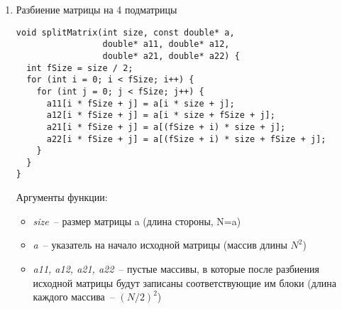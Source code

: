 \documentclass{report}
\begin{document}
\begin{enumerate}
\item Разбиение матрицы на 4 подматрицы
\begin{lstlisting}
void splitMatrix(int size, const double* a,
                 double* a11, double* a12,
                 double* a21, double* a22) {
  int fSize = size / 2;
  for (int i = 0; i < fSize; i++) {
    for (int j = 0; j < fSize; j++) {
      a11[i * fSize + j] = a[i * size + j];
      a12[i * fSize + j] = a[i * size + fSize + j];
      a21[i * fSize + j] = a[(fSize + i) * size + j];
      a22[i * fSize + j] = a[(fSize + i) * size + fSize + j];
    }
  }
}
\end{lstlisting}
\par Аргументы функции:
\begin{itemize}
\item \textit{size}~-- размер матрицы a (длина стороны, N=a)
\item \textit{a}~-- указатель на начало исходной матрицы (массив длины $N^2$)
\item \textit{a11, a12, a21, a22}~-- пустые массивы, в которые после разбиения исходной матрицы будут записаны соответствующие им блоки (длина каждого массива~-- $(N/2)^2$)


\end{itemize}
\end{enumerate}
\end{document}
